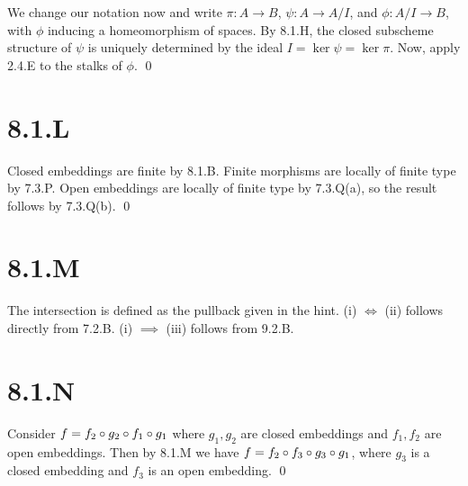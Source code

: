 \documentclass{article}
\begin{document}
We change our notation now and write $\pi: A \to B$,
$\psi: A \to A/I$, and $\phi: A/I \to B$, with $\phi$
inducing a homeomorphism of spaces. By 8.1.H, the closed subscheme structure of
$\psi$ is uniquely determined by the ideal
$I=\ker \psi = \ker \pi$. Now, apply 2.4.E to the stalks of
$\phi$. \qed

\section{8.1.L}
Closed embeddings are finite by 8.1.B. Finite morphisms are locally of finite
type by 7.3.P. Open embeddings are locally of finite type by 7.3.Q(a), so the
result follows by 7.3.Q(b). \qed

\section{8.1.M}
The intersection is defined as the pullback given in the hint. (i)
$\iff$ (ii) follows directly from 7.2.B. (i)
$\implies$ (iii) follows from 9.2.B.

\section{8.1.N}
Consider $f=f_2 \circ g_2 \circ f_1 \circ g_1$ where $g_1, g_2$ are closed
embeddings and $f_1, f_2$ are open embeddings. Then by 8.1.M we
have $f=f_2 \circ f_3 \circ g_3 \circ g_1$, where $g_3$ is a closed embedding
and $f_3$ is an open embedding. \qed
\end{document}
